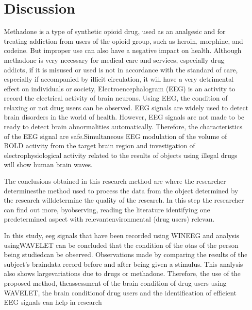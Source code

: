 \chapter{Discussion}

\par
       Methadone is a type of synthetic opioid drug, used as an analgesic and for treating addiction from users of the opioid group, such as heroin, morphine, and codeine. But improper use can also have a negative impact on health. Although methadone is very necessary for medical care and services, especially drug addicts, if it is misused or used is not in accordance with the standard of care, especially if accompanied by illicit circulation, it will have a very detrimental effect on individuals or society, Electroencephalogram (EEG) is an activity to record the electrical activity of brain neurons. Using EEG, the condition of relaxing or not drug users can be observed. EEG signals are widely used to detect brain disorders in the world of health. However, EEG signals are not made to be ready to detect brain abnormalities automatically. Therefore, the characteristics of the EEG signal are safe.Simultaneous EEG modulation of the volume of BOLD activity from the target brain region and investigation of electrophysiological activity related to the results of objects using illegal drugs will show human brain waves.
    
\par
    The conclusions obtained in this research method are where the researcher determinesthe method used to process the data from the object determined by the research willdetermine the quality of the research.  In this step the researcher can find out more, byobserving, reading the literature identifying one predetermined aspect with relevantenvironmental (drug users) relevan.
    
\par
    In this study, eeg signals that have been recorded using WINEEG and analysis usingWAVELET can be concluded that the condition of the otas of the person being studiedcan be observed.  Observations made by comparing the results of the subject’s braindata record before and after being given a stimulus.  This analysis also shows largevariations due to drugs or methadone.  Therefore, the use of the proposed method, theassessment of the brain condition of drug users using WAVELET, the brain conditionof drug users and the identification of efficient EEG signals can help in research